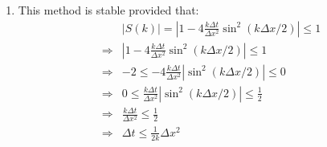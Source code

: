 \documentclass[12pt,a4]{article}
\begin{document}
\begin{enumerate}
  \item
    This method is stable provided that:
    \begin{align*}
                  & |S(k)| = |1 - 4\frac{k \Delta t}{\Delta x^2} \sin^2(k\Delta x / 2)| \leq 1\\
      \Rightarrow & |1 - 4\frac{k \Delta t}{\Delta x^2} \sin^2(k\Delta x / 2)| \leq 1\\
      \Rightarrow & -2 \leq - 4\frac{k \Delta t}{\Delta x^2} |\sin^2(k\Delta x / 2)| \leq 0\\
      \Rightarrow & 0 \leq \frac{k \Delta t}{\Delta x^2} |\sin^2(k\Delta x / 2)| \leq \frac{1}{2}\\
      \Rightarrow & \frac{k \Delta t}{\Delta x^2} \leq \frac{1}{2}\\
      \Rightarrow & \Delta t \leq \frac{1}{2 k}\Delta x^2
    \end{align*}
\end{enumerate}
\end{document}

